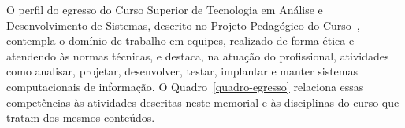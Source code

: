 \documentclass[memorial,capa]{texifsap}
\begin{document}

O perfil do egresso do Curso Superior de Tecnologia em Análise e
Desenvolvimento de Sistemas, descrito no Projeto Pedagógico do
Curso~\cite[p.~41-42]{IFSul:PPC}, contempla o domínio de trabalho em
equipes, realizado de forma ética e atendendo às normas técnicas, e
destaca, na atuação do profissional, atividades como analisar,
projetar, desenvolver, testar, implantar e manter sistemas
computacionais de informação. O Quadro~\ref{quadro-egresso} relaciona essas
competências às atividades descritas neste memorial e às disciplinas do
curso que tratam dos mesmos conteúdos.
\end{document}
